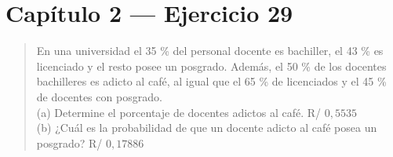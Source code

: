 \documentclass[11pt]{article}
\begin{document}
\section*{Cap\'itulo 2 --- Ejercicio 29}

\begin{quote}
En una universidad el 35 \% del personal docente es bachiller, el 43 \% es licenciado y el resto posee un posgrado. Adem\'as, el 50 \% de los docentes bachilleres es adicto al caf\'e, al igual que el 65 \% de licenciados y el 45 \% de docentes con posgrado.\\
(a) Determine el porcentaje de docentes adictos al caf\'e. \hfill R/ $0{,}5535$\\
(b) ¿Cu\'al es la probabilidad de que un docente adicto al caf\'e posea un posgrado? \hfill R/ $0{,}17886$
\end{quote}
\end{document}
